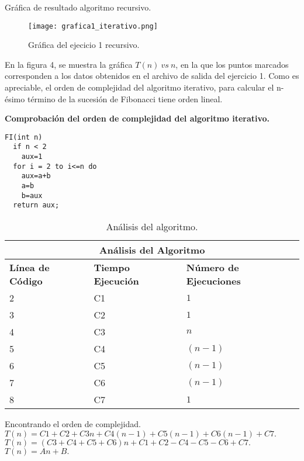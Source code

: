 \documentclass[12pt]{report}
\begin{document}
	Gráfica de resultado algoritmo recursivo.\\
	\begin{figure}[H]
		\texttt{[image: grafica1\_iterativo.png]}
		\centering
		\caption{Gráfica del ejecicio 1 recursivo.}
		\centering
	\end{figure}
	En la figura 4, se muestra la gráfica $T(n) \ vs \ n$, en la que los puntos marcados corresponden a los datos obtenidos en el archivo de salida del ejercicio 1. Como es apreciable, el orden de complejidad del algoritmo iterativo, para calcular el n-ésimo término de la sucesión de Fibonacci tiene orden lineal.\newpage
	
	\textbf{Comprobación del orden de complejidad del algoritmo iterativo.} \\
	
\lstset{language=C, breaklines=true, basicstyle=\footnotesize}
\lstset{numbers=left, numberstyle=\tiny, stepnumber=1, numbersep=10pt}
\begin{lstlisting}
FI(int n)
  if n < 2 
    aux=1
  for i = 2 to i<=n do
    aux=a+b	
    a=b		
    b=aux
  return aux;
\end{lstlisting}

\begin{table}[htbp]
	\begin{center}
		\begin{tabular}{|l|l|l|}
			\hline
			\multicolumn{3}{|c|}{Análisis del Algoritmo} \\ 
			\hline
			\textbf{Línea de Código} & \textbf{Tiempo Ejecución} & \textbf{Número de Ejecuciones}\\
			\hline
			2 & C1 & $1$ \\ \hline
			3 & C2 & $1$ \\ \hline
			4 & C3 & $n$ \\ \hline
			5 & C4 & $(n-1)$ \\ \hline
			6 & C5 & $(n-1)$ \\ \hline
			7 & C6 & $(n-1)$ \\ \hline
			8 & C7 & $1$ \\ \hline
		\end{tabular}
		\caption{Análisis del algoritmo.}
		\label{tabla:analisis}
	\end{center}
\end{table}
Encontrando el orden de complejidad.\\
$T(n)= C1+C2+C3n+C4(n-1)+C5(n-1)+C6(n-1)+C7.$\\
$T(n)= (C3+C4+C5+C6)n+C1+C2-C4-C5-C6+C7.$\\
$T(n)=An+B.$\\
\end{document}
